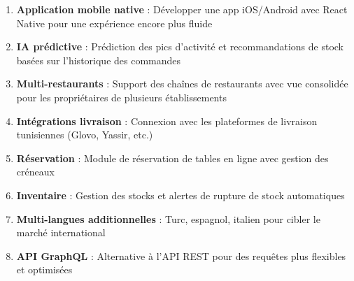 \documentclass[12pt,a4paper]{report}
\begin{document}
\begin{enumerate}[leftmargin=1.5cm, itemsep=0.3cm]
    \item \textbf{Application mobile native} : Développer une app iOS/Android avec React Native pour une expérience encore plus fluide
    \item \textbf{IA prédictive} : Prédiction des pics d'activité et recommandations de stock basées sur l'historique des commandes
    \item \textbf{Multi-restaurants} : Support des chaînes de restaurants avec vue consolidée pour les propriétaires de plusieurs établissements
    \item \textbf{Intégrations livraison} : Connexion avec les plateformes de livraison tunisiennes (Glovo, Yassir, etc.)
    \item \textbf{Réservation} : Module de réservation de tables en ligne avec gestion des créneaux
    \item \textbf{Inventaire} : Gestion des stocks et alertes de rupture de stock automatiques
    \item \textbf{Multi-langues additionnelles} : Turc, espagnol, italien pour cibler le marché international
    \item \textbf{API GraphQL} : Alternative à l'API REST pour des requêtes plus flexibles et optimisées
\end{enumerate}

\begin{center}
    \vspace{1cm}
\end{center}
\end{document}
